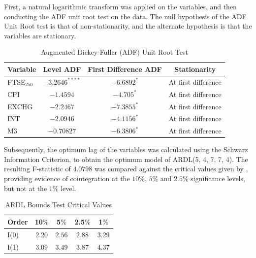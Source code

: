 \documentclass[11pt,a4paper]{article}
\newcommand{\citeboth}[1]{\citeauthor{#1} \citep{#1}}
\begin{document}
First, a natural logarithmic transform was applied on the variables, and 
then conducting the ADF unit root test on the data. The null hypothesis of the 
ADF Unit Root test is that of non-stationarity, and the alternate hypothesis 
is that the variables are stationary.


\begin{table}[h!]
    \centering
    \caption{Augmented Dickey-Fuller (ADF) Unit Root Test}
    \begin{tabular}{lccc}
        \toprule
        \textbf{Variable} & \textbf{Level ADF} & \textbf{First Difference ADF} & \textbf{Stationarity} \\
        \midrule
        FTSE$_{250}$ & $-3.2646^{****}$ & $-6.6892^{*}$ & At first difference \\
        CPI          & $-1.4594$ & $-4.705^{*}$ & At first difference \\
        EXCHG        & $-2.2467$ & $-7.3855^{*}$ & At first difference \\
        INT          & $-2.0946$ & $-4.1156^{*}$ & At first difference \\
        M3           & $-0.70827$ & $-6.3806^{*}$ & At first difference \\
        \bottomrule
    \end{tabular}
\end{table}


Subsequently, the optimum lag of the variables was calculated using the 
Schwarz Information Criterion, to obtain the optimum model 
of ARDL(5, 4, 7, 7, 4). The resulting F-statistic of $4.0798$ was compared against the critical values
given by \citeboth{pesaran2001}, providing evidence of cointegration 
at the $10\%$, $5\%$ and $2.5\%$ significance levels, but not at the $1\%$ 
level.

\begin{table}[h!]
    \centering
    \caption{ARDL Bounds Test Critical Values}
    \begin{tabular}{lcccc}
        \toprule
        \textbf{Order} & \textbf{10$\%$} & \textbf{5$\%$} & \textbf{2.5$\%$} & \textbf{1$\%$} \\
        \midrule
        I(0) & $2.20$ & $2.56$ & $2.88$ & $3.29$ \\
        I(1) & $3.09$ & $3.49$ & $3.87$  & $4.37$ \\
        \bottomrule
    \end{tabular}
\end{table}
\end{document}
